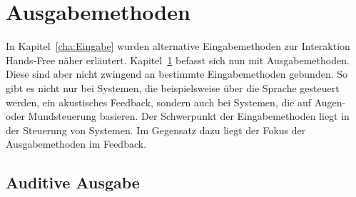 \chapter{Ausgabemethoden}
\label{cha:Ausgabe}

In Kapitel~\ref{cha:Eingabe} wurden alternative Eingabemethoden zur Interaktion Hands-Free näher erläutert. 
Kapitel~\ref{cha:Ausgabe} befasst sich nun mit Ausgabemethoden. Diese sind aber nicht zwingend an bestimmte Eingabemethoden gebunden. So gibt es nicht nur bei Systemen, die beispielsweise über die Sprache gesteuert werden, ein akustisches Feedback, sondern auch bei Systemen, die auf Augen- oder Mundsteuerung basieren. Der Schwerpunkt der Eingabemethoden liegt in der Steuerung von Systemen. Im Gegensatz dazu liegt der Fokus der Ausgabemethoden im Feedback.

\section{Auditive Ausgabe}


